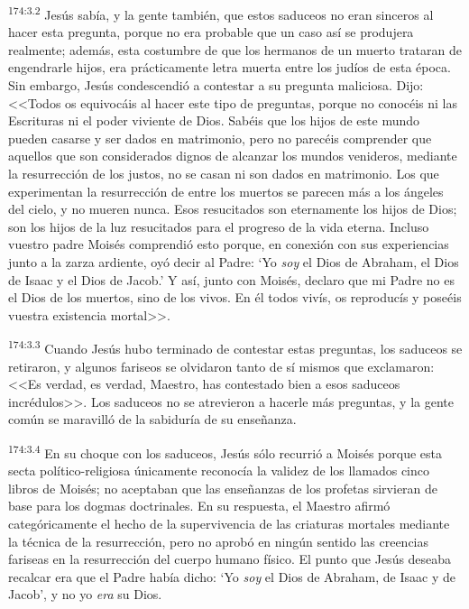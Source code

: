 \par 
\textsuperscript{174:3.2} Jesús sabía, y la gente también, que estos saduceos no eran sinceros al hacer esta pregunta, porque no era probable que un caso así se produjera realmente; además, esta costumbre de que los hermanos de un muerto trataran de engendrarle hijos, era prácticamente letra muerta entre los judíos de esta época. Sin embargo, Jesús condescendió a contestar a su pregunta maliciosa. Dijo: <<Todos os equivocáis al hacer este tipo de preguntas, porque no conocéis ni las Escrituras ni el poder viviente de Dios. Sabéis que los hijos de este mundo pueden casarse y ser dados en matrimonio, pero no parecéis comprender que aquellos que son considerados dignos de alcanzar los mundos venideros, mediante la resurrección de los justos, no se casan ni son dados en matrimonio. Los que experimentan la resurrección de entre los muertos se parecen más a los ángeles del cielo, y no mueren nunca. Esos resucitados son eternamente los hijos de Dios; son los hijos de la luz resucitados para el progreso de la vida eterna. Incluso vuestro padre Moisés comprendió esto porque, en conexión con sus experiencias junto a la zarza ardiente, oyó decir al Padre:
`Yo \textit{soy} el Dios de Abraham, el Dios de Isaac y el Dios de Jacob.' Y así, junto con Moisés, declaro que mi Padre no es el Dios de los muertos, sino de los vivos. En él todos vivís, os reproducís y poseéis vuestra existencia mortal>>.

\par 
\textsuperscript{174:3.3} Cuando Jesús hubo terminado de contestar estas preguntas, los saduceos se retiraron, y algunos fariseos se olvidaron tanto de sí mismos que exclamaron: <<Es verdad, es verdad, Maestro, has contestado bien a esos saduceos incrédulos>>. Los saduceos no se atrevieron a hacerle más preguntas, y la gente común se maravilló de la sabiduría de su enseñanza.

\par 
\textsuperscript{174:3.4} En su choque con los saduceos, Jesús sólo recurrió a Moisés porque esta secta político-religiosa únicamente reconocía la validez de los llamados cinco libros de Moisés; no aceptaban que las enseñanzas de los profetas sirvieran de base para los dogmas doctrinales. En su respuesta, el Maestro afirmó categóricamente el hecho de la supervivencia de las criaturas mortales mediante la técnica de la resurrección, pero no aprobó en ningún sentido las creencias fariseas en la resurrección del cuerpo humano físico. El punto que Jesús deseaba recalcar era que el Padre había dicho:
`Yo \textit{soy} el Dios de Abraham, de Isaac y de Jacob', y no yo \textit{era} su Dios.

